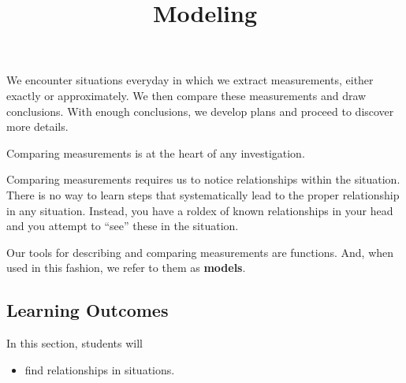 \documentclass{ximera}
\title{Modeling}
\begin{document}
\begin{abstract}
\end{abstract}
\maketitle





We encounter situations everyday in which we extract measurements, either exactly or approximately. We then compare these measurements and draw conclusions.  With enough conclusions, we develop plans and proceed to discover more details.


Comparing measurements is at the heart of any investigation.

Comparing measurements requires us to notice relationships within the situation.  There is no way to learn steps that systematically lead to the proper relationship in any situation.  Instead, you have a roldex of known relationships in your head and you attempt to ``see'' these in the situation.



Our tools for describing and comparing measurements are functions.  And, when used in this fashion, we refer to them as \textbf{models}.

























\subsection{Learning Outcomes}


\begin{sectionOutcomes}
In this section, students will 

\begin{itemize}
\item find relationships in situations.
\end{itemize}
\end{sectionOutcomes}
\end{document}
